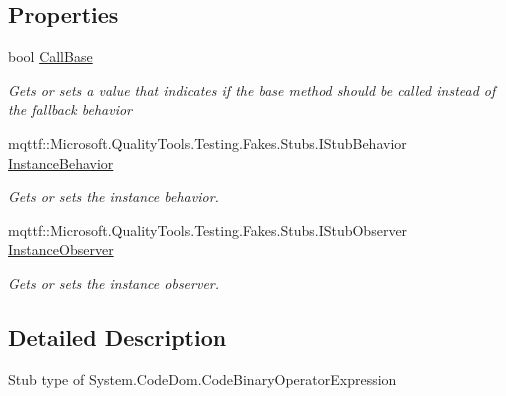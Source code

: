 \subsection*{Properties}
\begin{DoxyCompactItemize}
\item 
bool \hyperlink{class_system_1_1_code_dom_1_1_fakes_1_1_stub_code_binary_operator_expression_aa0449dffccec2f3cdfeb63b41f01658a}{Call\-Base}
\begin{DoxyCompactList}\small\item\em Gets or sets a value that indicates if the base method should be called instead of the fallback behavior\end{DoxyCompactList}\item 
mqttf\-::\-Microsoft.\-Quality\-Tools.\-Testing.\-Fakes.\-Stubs.\-I\-Stub\-Behavior \hyperlink{class_system_1_1_code_dom_1_1_fakes_1_1_stub_code_binary_operator_expression_aa9f591157c8189794b8491b890409576}{Instance\-Behavior}
\begin{DoxyCompactList}\small\item\em Gets or sets the instance behavior.\end{DoxyCompactList}\item 
mqttf\-::\-Microsoft.\-Quality\-Tools.\-Testing.\-Fakes.\-Stubs.\-I\-Stub\-Observer \hyperlink{class_system_1_1_code_dom_1_1_fakes_1_1_stub_code_binary_operator_expression_ad06a5793903956ecec5d4fe30e4213ec}{Instance\-Observer}
\begin{DoxyCompactList}\small\item\em Gets or sets the instance observer.\end{DoxyCompactList}\end{DoxyCompactItemize}


\subsection{Detailed Description}
Stub type of System.\-Code\-Dom.\-Code\-Binary\-Operator\-Expression



